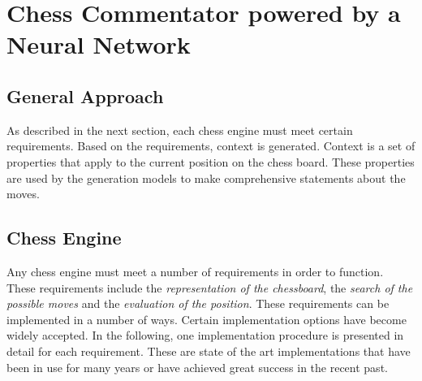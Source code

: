 \section{Chess Commentator powered by a Neural Network}

\subsection{General Approach}


As described in the next section, each chess engine must meet certain requirements. Based on the requirements, context is generated. Context is a set of properties that apply to the current position on the chess board. These properties are used by the generation models to make comprehensive statements about the moves.


\subsection{Chess Engine}

Any chess engine must meet a number of requirements in order to function. These requirements include the \textit{representation of the chessboard}, the \textit{search of the possible moves} and the \textit{evaluation of the position}. These requirements can be implemented in a number of ways. Certain implementation options have become widely accepted. In the following, one implementation procedure is presented in detail for each requirement. These are state of the art implementations that have been in use for many years or have achieved great success in the recent past.

